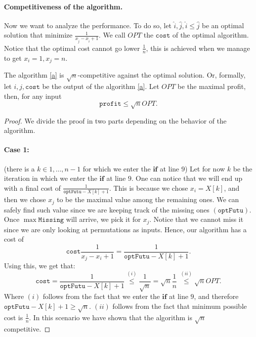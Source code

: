 \documentclass[11pt]{article}
\begin{document}
\begin{enumerate}
        \paragraph*{Competitiveness of the algorithm.}
        Now we want to analyze the performance. To do so, let $\hat i, \hat j, \hat i \leq \hat j$ be an optimal solution that minimize $\frac{1}{x_{\hat j}-x_{\hat i}+1}$. We call $OPT$ the $\mathtt{cost}$ of the optimal algorithm. Notice that the optimal cost cannot go lower $\frac{1}{n}$, this is achieved when we manage to get $x_i = 1, x_j = n$.
        \begin{theorem} The algorithm \ref{a} is $\sqrt{n}$-competitive against the optimal solution. Or, formally, let $i, j, \mathtt{cost}$ be the output of the algorithm \ref{a}. Let $OPT$ be the maximal profit, then, for any input
            \begin{equation*}
                \mathtt{profit}\leq \sqrt{n} OPT.
            \end{equation*}
        \end{theorem}
        \begin{proof}
            We divide the proof in two parts depending on the behavior of the algorithm. 
            \paragraph*{Case 1:}(there is a $k \in {1,\dots,n-1}$ for which we enter the $\mathbf{if}$ at line $9$) Let for now $k$ be the iteration in which we enter the $\mathbf{if}$ at line $9$. One can notice that we will end up with a final cost of $\frac{1}{\mathtt{optFutu} - X[k] + 1}$. This is because we chose $x_i = X[k]$, and then we chose $x_j$ to be the maximal value among the remaining ones. We can safely find such value since we are keeping track of the missing ones $(\mathtt{optFutu})$. Once $\max \mathtt{Missing}$ will arrive, we pick it for $x_j$. 
            Notice that we cannot miss it since we are only looking at permutations as inputs. Hence, our algorithm has a cost of 
            \begin{equation*}
                \mathtt{cost} \frac{1}{x_j-x_i +1}=\frac{1}{\mathtt{optFutu} - X[k] + 1}.
            \end{equation*}
            Using this, we get that:
            \begin{equation*}
                \mathtt{cost} = \frac{1}{\mathtt{optFutu} - X[k] + 1} \stackrel{(i)}{\leq}\frac{1}{\sqrt{n}} =  \sqrt{n}\frac{1}{n}\ \stackrel{(ii)}{\leq} \sqrt{n}OPT.
            \end{equation*}
            Where $(i)$ follows from the fact that we enter the $\mathbf{if}$ at line $9$, and therefore $\mathtt{optFutu} - X[k] + 1 \geq \sqrt{n}$. $(ii)$ follows from the fact that minimum possible cost is $\frac{1}{n}$. In this scenario we have shown that the algorithm is $\sqrt{n}$ competitive.

\end{proof}
\end{enumerate}
\end{document}
